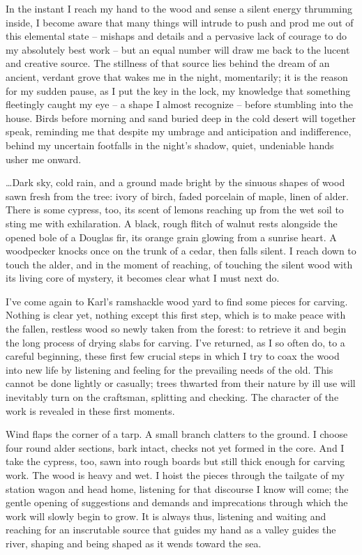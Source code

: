 \documentclass[10pt,DIV09,letterpaper,oneside,headsepline]{scrreprt}
\begin{document}
In the instant I reach my hand to the wood and sense a silent energy thrumming inside, I become aware that many things will intrude to push and prod me out of this elemental state -- mishaps and details and a pervasive lack of courage to do my absolutely best work -- but an equal number will draw me back to the lucent and creative source. The stillness of that source lies behind the dream of an ancient, verdant grove that wakes me in the night, momentarily; it is the reason for my sudden pause, as I put the key in the lock, my knowledge that something fleetingly caught my eye -- a shape I almost recognize -- before stumbling into the house. Birds before morning and sand buried deep in the cold desert will together speak, reminding me that despite my umbrage and anticipation and indifference, behind my uncertain footfalls in the night's shadow, quiet, undeniable hands usher me onward.

\ldots Dark sky, cold rain, and a ground made bright by the sinuous shapes of wood sawn fresh from the tree: ivory of birch, faded porcelain of maple, linen of alder. There is some cypress, too, its scent of lemons reaching up from the wet soil to sting me with exhilaration. A black, rough flitch of walnut rests alongside the opened bole of a Douglas fir, its orange grain glowing from a sunrise heart. A woodpecker knocks once on the trunk of a cedar, then falls silent. I reach down to touch the alder, and in the moment of reaching, of touching the silent wood with its living core of mystery, it becomes clear what I must next do.

I've come again to Karl's ramshackle wood yard to find some pieces for carving. Nothing is clear yet, nothing except this first step, which is to make peace with the fallen, restless wood so newly taken from the forest: to retrieve it and begin the long process of drying slabs for carving. I've returned, as I so often do, to a careful beginning, these first few crucial steps in which I try to coax the wood into new life by listening and feeling for the prevailing needs of the old. This cannot be done lightly or casually; trees thwarted from their nature by ill use will inevitably turn on the craftsman, splitting and checking. The character of the work is revealed in these first moments.

Wind flaps the corner of a tarp. A small branch clatters to the ground. I choose four round alder sections, bark intact, checks not yet formed in the core. And I take the cypress, too, sawn into rough boards but still thick enough for carving work. The wood is heavy and wet. I hoist the pieces through the tailgate of my station wagon and head home, listening for that discourse I know will come; the gentle opening of suggestions and demands and imprecations through which the work will slowly begin to grow. It is always thus, listening and waiting and reaching for an inscrutable source that guides my hand as a valley guides the river, shaping and being shaped as it wends toward the sea.
\end{document}
